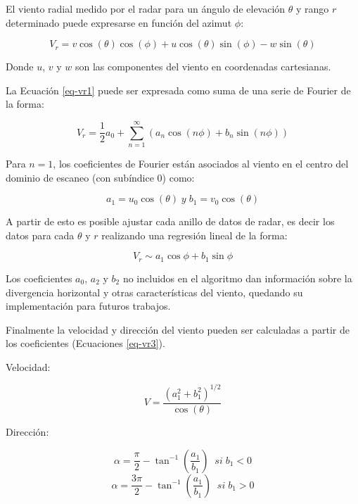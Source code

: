 \documentclass[12pt,spanish,oneside]{book}
\begin{document}
El viento radial medido por el radar para un ángulo de elevación
\(\theta\) y rango \(r\) determinado puede expresarse en función del
azimut \(\phi\):

\begin{equation}
\label{eq-vr1}
V_r =  v \cos(\theta) \cos(\phi) + u \cos(\theta) \sin(\phi) - w \sin(\theta)
\end{equation}

Donde \(u\), \(v\) y \(w\) son las componentes del viento en coordenadas
cartesianas.

La Ecuación \ref{eq-vr1} puede ser expresada como suma de una serie de
Fourier de la forma:

\begin{equation}
\label{eq-vr2}
V_r =  \frac{1}{2}a_0 + \sum_{n = 1}^{\infty} (a_n \cos(n\phi) + b_n \sin(n \phi)) 
\end{equation}

Para \(n=1\), los coeficientes de Fourier están asociados al viento en
el centro del dominio de escaneo (con subíndice 0) como:

\begin{equation} \label{eq-vr3}
a_1 = u_0 \cos(\theta) \; y \;
b_1 = v_0 \cos(\theta) 
\end{equation}

A partir de esto es posible ajustar cada anillo de datos de radar, es
decir los datos para cada \(\theta\) y \(r\) realizando una regresión
lineal de la forma:

\begin{equation}
\label{eq-vr4}
V_r \sim a_1\cos \phi + b_1 \sin \phi
\end{equation}

Los coeficientes \(a_0\), \(a_2\) y \(b_2\) no incluidos en el algoritmo
dan información sobre la divergencia horizontal y otras características
del viento, quedando su implementación para futuros trabajos.

Finalmente la velocidad y dirección del viento pueden ser calculadas a
partir de los coeficientes (Ecuaciones \ref{eq-vr3}).

Velocidad:

\begin{equation}
\label{eq-vr5}
V = \frac{(a_{1}^{2} + b_{1}^{2})^{1/2}}{\cos(\theta)}
\end{equation}

Dirección:

\begin{equation}\label{eq-vr6}
\alpha = \frac{\pi}{2}-\tan^{-1}(\frac{a_1}{b_1}) \; \; si \; b_1 < 0 
\end{equation}\begin{equation}\label{eq-vr7}
\alpha = \frac{3\pi}{2}-\tan^{-1}(\frac{a_1}{b_1}) \; \; si \; b_1 > 0
\end{equation}
\end{document}
